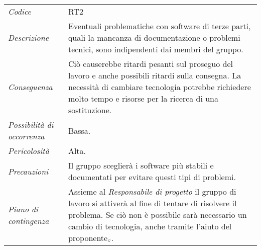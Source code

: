 {{	\begin{center}
		\renewcommand{\arraystretch}{1.4}
		\begin{longtable}{|p{5cm}|p{12cm}|}
			\hline
			\rowcolor{airforceblue}
			\multicolumn{2}{|c|}{\textit{Software terze parti}}\\
			\hline
			\textit{Codice} & RT2 \\
			\hline
			\textit{Descrizione} & Eventuali problematiche con software di terze parti, quali la mancanza di documentazione o problemi tecnici, sono indipendenti dai membri del gruppo. \\
			\hline
			\textit{Conseguenza} & Ciò causerebbe ritardi pesanti sul proseguo del lavoro e anche possibili ritardi sulla consegna.
			La necessità di cambiare tecnologia potrebbe richiedere molto tempo e risorse per la ricerca di una sostituzione. \\
			\hline
			\textit{Possibilità di occorrenza} & Bassa. \\
			\hline
			\textit{Pericolosità} & Alta. \\
			\hline
			\textit{Precauzioni} & Il gruppo sceglierà i software più stabili e documentati per evitare questi tipi di problemi.  \\
			\hline
			\textit{Piano di contingenza} & Assieme al \textit{Responsabile di progetto} il gruppo di lavoro si attiverà al fine di tentare di risolvere il problema. Se ciò non è possibile sarà necessario un cambio di tecnologia, anche tramite l'aiuto del proponente$_{\scaleto{G}{3pt}}$.  \\
			\hline
		\end{longtable}
	\end{center}


\def\tabularxcolumn#1{m{#1}}
{

}}}
